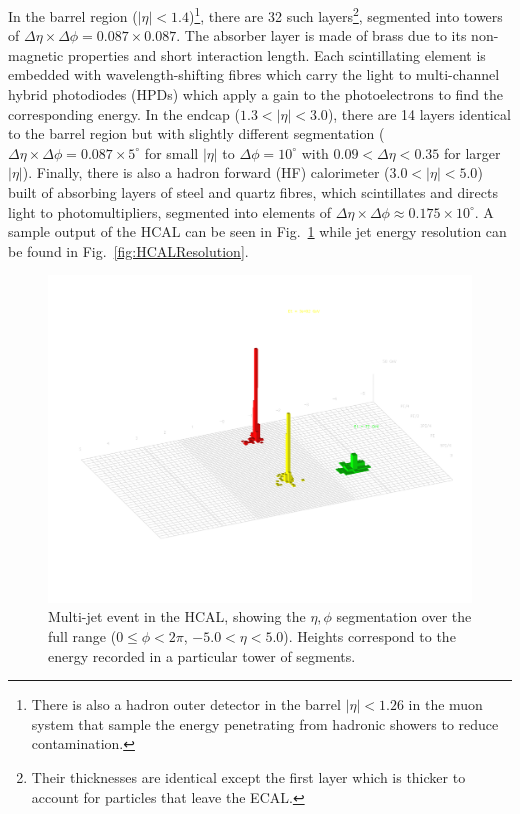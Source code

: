 In the barrel region ($|\eta|<1.4$)\footnote{There is also a hadron outer detector in the barrel $|\eta|<1.26$ in the muon system that sample the energy penetrating from hadronic showers to reduce contamination.}, there are 32 such layers\footnote{Their thicknesses are identical except the first layer which is thicker to account for particles that leave the ECAL.}, segmented into towers of $\Delta\eta\times\Delta\phi = 0.087\times0.087$. The absorber layer is made of brass due to its non-magnetic properties and short interaction length. Each scintillating element is embedded with wavelength-shifting fibres which carry the light to multi-channel hybrid photodiodes (HPDs) which apply a gain to the photoelectrons to find the corresponding energy. In the endcap ($1.3<|\eta|<3.0$), there are 14 layers identical to the barrel region but with slightly different segmentation ($\Delta\eta\times\Delta\phi = 0.087\times5^{\circ}$ for small $|\eta|$ to $\Delta\phi=10^{\circ}$ with $0.09<\Delta\eta<0.35$ for larger $|\eta|$). Finally, there is also a hadron forward (HF) calorimeter ($3.0<|\eta|<5.0$) built of absorbing layers of steel and quartz fibres, which scintillates and directs light to photomultipliers, segmented into elements of $\Delta\eta\times\Delta\phi \approx 0.175\times10^{\circ}$. A sample output of the HCAL can be seen in Fig.~\ref{fig:HCALOutput} while jet energy resolution can be found in Fig.~\ref{fig:HCALResolution}.

\begin{figure}[htbp]
\begin{center}
\includegraphics[width=.7\linewidth]{Experiment/figures/HCALOutput.pdf}
\caption[Sample Output of the Hadronic Calorimeter]{Multi-jet event in the HCAL, showing the $\eta,\phi$ segmentation over the full range ($0\leq\phi<2\pi$, $-5.0<\eta<5.0$). Heights correspond to the energy recorded in a particular tower of segments.}
\label{fig:HCALOutput}
\end{center}
\end{figure}

